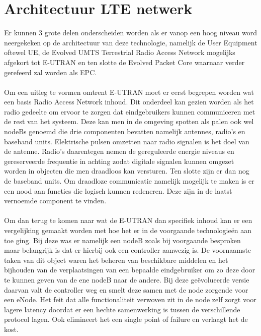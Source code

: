 \section{Architectuur LTE netwerk}
Er kunnen 3 grote delen onderscheiden worden als er vanop een hoog niveau word neergekeken op de architectuur van deze technologie, namelijk de User Equipment oftewel UE, de Evolved UMTS Terrestrial Radio Access Network mogelijks afgekort tot E-UTRAN en ten slotte de Evolved Packet Core waarnaar verder gerefeerd zal worden als EPC. \autocite{Richard2021}
\\ \\
Om een uitleg te vormen omtrent E-UTRAN moet er eerst begrepen worden wat een basis Radio Access Network inhoud. Dit onderdeel kan gezien worden als het radio gedeelte om ervoor te zorgen dat eindgebruikers kunnen communiceren met de rest van het systeem. Deze kan men in de omgeving spotten als palen ook wel nodeBs genoemd die drie componenten bevatten namelijk antennes, radio's en baseband units. Elektrische pulsen omzetten naar radio signalen is het doel van de antenne. Radio's daarentegen nemen de gereguleerde energie niveaus en gereserveerde frequentie in achting zodat digitale signalen kunnen omgezet worden in objecten die men draadloos kan versturen. Ten slotte zijn er dan nog de baseband units. Om draadloze communicatie namelijk mogelijk te maken is er een nood aan functies die logisch kunnen redeneren. Deze zijn in de laatst vernoemde component te vinden. \autocite{Jones2021} \\ \\
Om dan terug te komen naar wat de E-UTRAN dan specifiek inhoud kan er een vergelijking gemaakt worden met hoe het er in de voorgaande technologieën aan toe ging. Bij deze was er namelijk een nodeB zoals bij voorgaande besproken maar belangrijk is dat er hierbij ook een controller aanwezig is. De voornaamste taken van dit object waren het beheren van beschikbare middelen en het bijhouden van de verplaatsingen van een bepaalde eindgebruiker om zo deze door te kunnen geven van de ene nodeB naar de andere. Bij deze geëvolueerde versie daarvan valt de controller weg en smelt deze samen met de node zorgende voor een eNode. \autocite{Ghayas2019} Het feit dat alle functionaliteit verwoven zit in de node zelf zorgt voor lagere latency doordat er een hechte samenwerking is tussen de verschillende protocol lagen. Ook elimineert het een single point of failure en verlaagt het de kost. \autocite{Palat2011} \\

